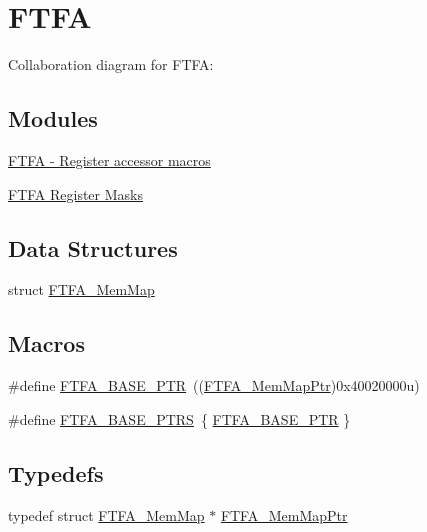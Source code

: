 \hypertarget{group___f_t_f_a___peripheral}{}\section{F\+T\+FA}
\label{group___f_t_f_a___peripheral}
Collaboration diagram for F\+T\+FA\+:
\subsection*{Modules}
\begin{DoxyCompactItemize}
\item 
\hyperlink{group___f_t_f_a___register___accessor___macros}{F\+T\+F\+A -\/ Register accessor macros}
\item 
\hyperlink{group___f_t_f_a___register___masks}{F\+T\+F\+A Register Masks}
\end{DoxyCompactItemize}
\subsection*{Data Structures}
\begin{DoxyCompactItemize}
\item 
struct \hyperlink{struct_f_t_f_a___mem_map}{F\+T\+F\+A\+\_\+\+Mem\+Map}
\end{DoxyCompactItemize}
\subsection*{Macros}
\begin{DoxyCompactItemize}
\item 
\#define \hyperlink{group___f_t_f_a___peripheral_ga13ad52f12d5b04e5e01f69ab18ed9216}{F\+T\+F\+A\+\_\+\+B\+A\+S\+E\+\_\+\+P\+TR}~((\hyperlink{group___f_t_f_a___peripheral_ga49d048bbeb55a090a5ecfe86ff767884}{F\+T\+F\+A\+\_\+\+Mem\+Map\+Ptr})0x40020000u)
\item 
\#define \hyperlink{group___f_t_f_a___peripheral_ga3f06770a713a2c02c4eec6b98daefd7e}{F\+T\+F\+A\+\_\+\+B\+A\+S\+E\+\_\+\+P\+T\+RS}~\{ \hyperlink{group___f_t_f_a___peripheral_ga13ad52f12d5b04e5e01f69ab18ed9216}{F\+T\+F\+A\+\_\+\+B\+A\+S\+E\+\_\+\+P\+TR} \}
\end{DoxyCompactItemize}
\subsection*{Typedefs}
\begin{DoxyCompactItemize}
\item 
typedef struct \hyperlink{struct_f_t_f_a___mem_map}{F\+T\+F\+A\+\_\+\+Mem\+Map} $\ast$ \hyperlink{group___f_t_f_a___peripheral_ga49d048bbeb55a090a5ecfe86ff767884}{F\+T\+F\+A\+\_\+\+Mem\+Map\+Ptr}
\end{DoxyCompactItemize}


